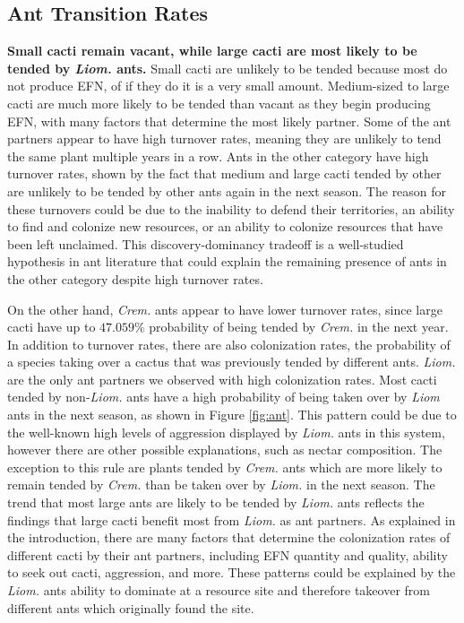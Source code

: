 \documentclass[12pt,a4paper]{article}
\begin{document}
		\subsection*{Ant Transition Rates}
		\textbf{Small cacti remain vacant, while large cacti are most likely to be tended by \textit{Liom.} ants.}
		Small cacti are unlikely to be tended because most do not produce EFN, of if they do it is a very small amount. 
		Medium-sized to large cacti are much more likely to be tended than vacant as they begin producing EFN, with many factors that determine the most likely partner. 
		Some of the ant partners appear to have high turnover rates, meaning they are unlikely to tend the same plant multiple years in a row. 
		Ants in the other category have high turnover rates, shown by the fact that medium and large cacti tended by other are unlikely to be tended by other ants again in the next season. 
		The reason for these turnovers could be due to the inability to defend their territories, an ability to find and colonize new resources, or an ability to colonize resources that have been left unclaimed. 
		This discovery-dominancy tradeoff is a well-studied hypothesis in ant literature \cite{lach2010} that could explain the remaining presence of ants in the other category despite high turnover rates.
		
		
		On the other hand, \textit{Crem.} ants appear to have lower turnover rates, since large cacti have up to $47.059\%$ probability of being tended by \textit{Crem.} in the next year.
		In addition to turnover rates, there are also colonization rates, the probability of a species taking over a cactus that was previously tended by different ants. 
		\textit{Liom.} are the only ant partners we observed with high colonization rates. 
		Most cacti tended by non-\textit{Liom.} ants have a high probability of being taken over by \textit{Liom} ants in the next season, as shown in Figure \ref{fig:ant}.
		This pattern could be due to the well-known high levels of aggression displayed by \textit{Liom.} ants in this system, however there are other possible explanations, such as nectar composition.
		The exception to this rule are plants tended by \textit{Crem.} ants which are more likely to remain tended by \textit{Crem.} than be taken over by \textit{Liom.} in the next season. 
		The trend that most large ants are likely to be tended by \textit{Liom.} ants reflects the findings that large cacti benefit most from \textit{Liom.} as ant partners. 
		As explained in the introduction, there are many factors that determine the colonization rates of different cacti by their ant partners, including EFN quantity and quality, ability to seek out cacti, aggression, and more.
		These patterns could be explained by the \textit{Liom.} ants ability to dominate at a resource site and therefore takeover from different ants which originally found the site. 
		
\end{document}
